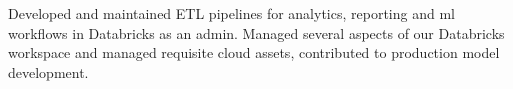 \documentclass[
  a4paper, 
]{FormatDetails}
\begin{document}
\makefrontsidebar


\begin{cvtable}
    \vspace{2mm}
    {Developed and maintained ETL pipelines for analytics, reporting and ml workflows in Databricks as an admin. Managed several aspects of our Databricks workspace and managed requisite cloud assets, contributed to production model development.}
    \vspace{2mm}

\end{cvtable}
\end{document}
